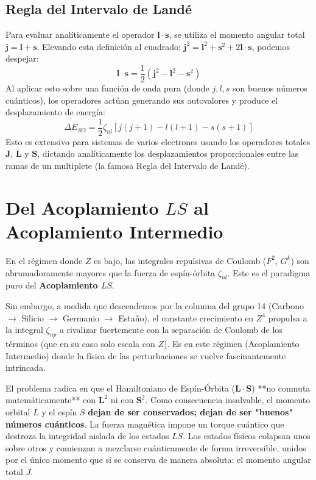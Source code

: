 \documentclass[11pt,a4paper]{article}
\begin{document}
\subsection{Regla del Intervalo de Landé}
Para evaluar analíticamente el operador $\mathbf{l} \cdot \mathbf{s}$, se utiliza el momento angular total $\mathbf{j} = \mathbf{l} + \mathbf{s}$. Elevando esta definición al cuadrado: $\mathbf{j}^2 = \mathbf{l}^2 + \mathbf{s}^2 + 2\mathbf{l}\cdot\mathbf{s}$, podemos despejar:
\begin{equation}
\mathbf{l} \cdot \mathbf{s} = \frac{1}{2} (\mathbf{j}^2 - \mathbf{l}^2 - \mathbf{s}^2)
\end{equation}
Al aplicar esto sobre una función de onda pura (donde $j, l, s$ son buenos números cuánticos), los operadores actúan generando sus autovalores y produce el desplazamiento de energía:
\begin{equation}
\Delta E_{SO} = \frac{1}{2} \zeta_{nl} \left[ j(j+1) - l(l+1) - s(s+1) \right]
\end{equation}
Esto es extensivo para sistemas de varios electrones usando los operadores totales $\mathbf{J}$, $\mathbf{L}$ y $\mathbf{S}$, dictando analíticamente los desplazamientos proporcionales entre las ramas de un multiplete (la famosa Regla del Intervalo de Landé).

\section{Del Acoplamiento $LS$ al Acoplamiento Intermedio}

En el régimen donde $Z$ es bajo, las integrales repulsivas de Coulomb ($F^2$, $G^k$) son abrumadoramente mayores que la fuerza de espín-órbita $\zeta_{nl}$. Este es el paradigma puro del \textbf{Acoplamiento $LS$}.

Sin embargo, a medida que descendemos por la columna del grupo 14 (Carbono $\rightarrow$ Silicio $\rightarrow$ Germanio $\rightarrow$ Estaño), el constante crecimiento en $Z^4$ propulsa a la integral $\zeta_{np}$ a rivalizar fuertemente con la separación de Coulomb de los términos (que en su caso solo escala con $Z$). Es en este régimen (Acoplamiento Intermedio) donde la física de las perturbaciones se vuelve fascinantemente intrincada.

El problema radica en que el Hamiltoniano de Espín-Órbita ($\mathbf{L} \cdot \mathbf{S}$) **no conmuta matemáticamente** con $\mathbf{L}^2$ ni con $\mathbf{S}^2$.
Como consecuencia insalvable, el momento orbital $L$ y el espín $S$ \textbf{dejan de ser conservados; dejan de ser "buenos" números cuánticos}. La fuerza magnética impone un torque cuántico que destroza la integridad aislada de los estados $LS$. Los estados físicos colapsan unos sobre otros y comienzan a mezclarse cuánticamente de forma irreversible, unidos por el único momento que sí se conserva de manera absoluta: el momento angular total $J$.
\end{document}
